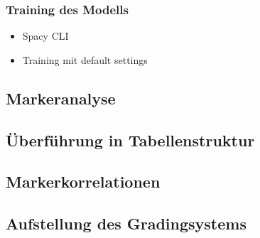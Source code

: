 \subsubsection{Training des Modells}
\begin{itemize}
    \item Spacy CLI
    \item Training mit default settings
\end{itemize}

\subsection{Markeranalyse}
\subsection{Überführung in Tabellenstruktur}
\subsection{Markerkorrelationen}
\subsection{Aufstellung des Gradingsystems}
